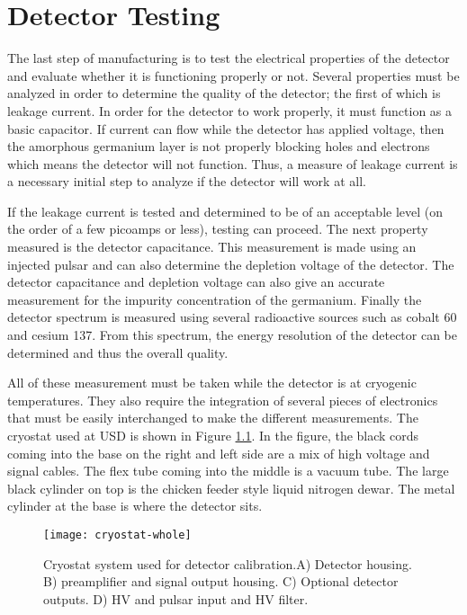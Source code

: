 \chapter{Detector Testing}
The last step of manufacturing is to test the electrical properties of the detector and evaluate whether it is functioning properly or not.
Several properties must be analyzed in order to determine the quality of the detector; the first of which is leakage current.
In order for the detector to work properly, it must function as a basic capacitor.
If current can flow while the detector has applied voltage, then the amorphous germanium layer is not properly blocking holes and electrons which means the detector will not function.
Thus, a measure of leakage current is a necessary initial step to analyze if the detector will work at all.

If the leakage current is tested and determined to be of an acceptable level (on the order of a few picoamps or less), testing can proceed.
The next property measured is the detector capacitance.
This measurement is made using an injected pulsar and can also determine the depletion voltage of the detector.
The detector capacitance and depletion voltage can also give an accurate measurement for the impurity concentration of the germanium.
Finally the detector spectrum is measured using several radioactive sources such as cobalt 60 and cesium 137.
From this spectrum, the energy resolution of the detector can be determined and thus the overall quality.

All of these measurement must be taken while the detector is at cryogenic temperatures.
They also require the integration of several pieces of electronics that must be easily interchanged to make the different measurements.
The cryostat used at USD is shown in Figure \ref{fig:cryostat-whole}.
In the figure, the black cords coming into the base on the right and left side are a mix of high voltage and signal cables.
The flex tube coming into the middle is a vacuum tube.
The large black cylinder on top is the chicken feeder style liquid nitrogen dewar.
The metal cylinder at the base is where the detector sits.
\begin{figure}[htpb]
\centering
\texttt{[image: cryostat-whole]}
  \caption{Cryostat system used for detector calibration.A) Detector housing. B) preamplifier and signal output housing. C) Optional detector outputs. D) HV and pulsar input  and HV filter.}
\label{fig:cryostat-whole}
\end{figure}

